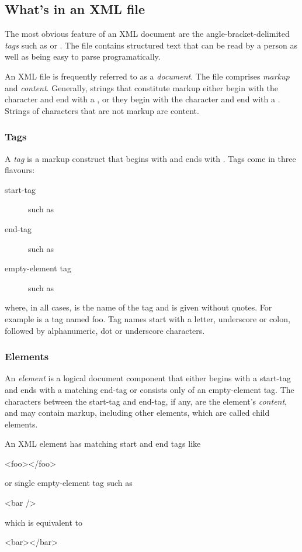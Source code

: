 \subsection{What's in an XML file}
The most obvious feature of an XML document are the angle-bracket-delimited \emph{tags}  such as  or .
The file contains structured text that can be read by a person as well as being easy to parse programatically.

An XML file is frequently referred to as a \textit{document}.
The file comprises \emph{markup} and \emph{content}.
Generally, strings that constitute markup either begin with the character \xml{<} and end with a \xml{>}, or they begin with the character \xml{\&} and end with a \xml{;}. Strings of characters that are not markup are content.

\subsubsection{Tags}

A \emph{tag} is a markup construct that begins with \xml{<} and ends with \xml{>}. Tags come in three flavours:
\begin{description}
\item[start-tag] such as 
\item[end-tag] such as 
\item[empty-element tag] such as 
\end{description}
where, in all cases,  is the name of the tag and is given without quotes.  For example  is a tag named foo.
Tag names start with a letter, underscore or colon, followed by alphanumeric, dot or underscore characters.  

\subsubsection{Elements}
An \emph{element} is a logical document component that either begins with a start-tag and ends with a matching end-tag or consists only of an empty-element tag. The characters between the start-tag and end-tag, if any, are the element's \emph{content}, and may contain markup, including other elements, which are called child elements. 

An XML element has matching start and end tags like
\begin{XML}
<foo></foo>
\end{XML}
or single empty-element tag such as
\begin{XML} 
<bar />
\end{XML}
which is equivalent to 
\begin{XML} 
<bar></bar>
\end{XML}

